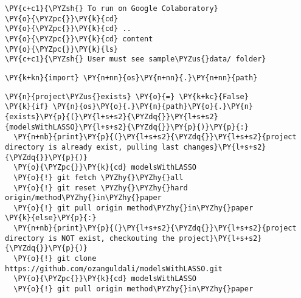     \begin{tcolorbox}[breakable, size=fbox, boxrule=1pt, pad at break*=1mm,colback=cellbackground, colframe=cellborder]
\begin{Verbatim}[commandchars=\\\{\}]
\PY{c+c1}{\PYZsh{} To run on Google Colaboratory}
\PY{o}{\PYZpc{}}\PY{k}{cd}
\PY{o}{\PYZpc{}}\PY{k}{cd} ..
\PY{o}{\PYZpc{}}\PY{k}{cd} content
\PY{o}{\PYZpc{}}\PY{k}{ls}
\PY{c+c1}{\PYZsh{} User must see sample\PYZus{}data/ folder}
\end{Verbatim}
\end{tcolorbox}

    \begin{tcolorbox}[breakable, size=fbox, boxrule=1pt, pad at break*=1mm,colback=cellbackground, colframe=cellborder]
\begin{Verbatim}[commandchars=\\\{\}]
\PY{k+kn}{import} \PY{n+nn}{os}\PY{n+nn}{.}\PY{n+nn}{path}
\end{Verbatim}
\end{tcolorbox}

    \begin{tcolorbox}[breakable, size=fbox, boxrule=1pt, pad at break*=1mm,colback=cellbackground, colframe=cellborder]
\begin{Verbatim}[commandchars=\\\{\}]
\PY{n}{project\PYZus{}exists} \PY{o}{=} \PY{k+kc}{False}
\PY{k}{if} \PY{n}{os}\PY{o}{.}\PY{n}{path}\PY{o}{.}\PY{n}{exists}\PY{p}{(}\PY{l+s+s2}{\PYZdq{}}\PY{l+s+s2}{modelsWithLASSO}\PY{l+s+s2}{\PYZdq{}}\PY{p}{)}\PY{p}{:}
  \PY{n+nb}{print}\PY{p}{(}\PY{l+s+s2}{\PYZdq{}}\PY{l+s+s2}{project directory is already exist, pulling last changes}\PY{l+s+s2}{\PYZdq{}}\PY{p}{)}
  \PY{o}{\PYZpc{}}\PY{k}{cd} modelsWithLASSO
  \PY{o}{!} git fetch \PYZhy{}\PYZhy{}all
  \PY{o}{!} git reset \PYZhy{}\PYZhy{}hard origin/method\PYZhy{}in\PYZhy{}paper
  \PY{o}{!} git pull origin method\PYZhy{}in\PYZhy{}paper
\PY{k}{else}\PY{p}{:}
  \PY{n+nb}{print}\PY{p}{(}\PY{l+s+s2}{\PYZdq{}}\PY{l+s+s2}{project directory is NOT exist, checkouting the project}\PY{l+s+s2}{\PYZdq{}}\PY{p}{)}
  \PY{o}{!} git clone https://github.com/ozanguldali/modelsWithLASSO.git
  \PY{o}{\PYZpc{}}\PY{k}{cd} modelsWithLASSO
  \PY{o}{!} git pull origin method\PYZhy{}in\PYZhy{}paper
\end{Verbatim}
\end{tcolorbox}

